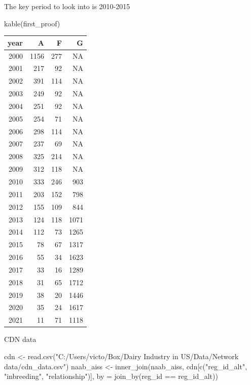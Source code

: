 \documentclass[
]{article}
\newenvironment{Shaded}{\begin{snugshade}}{\end{snugshade}}
\newcommand{\AttributeTok}[1]{\textcolor[rgb]{0.77,0.63,0.00}{#1}}
\newcommand{\FunctionTok}[1]{\textcolor[rgb]{0.00,0.00,0.00}{#1}}
\newcommand{\NormalTok}[1]{#1}
\newcommand{\OtherTok}[1]{\textcolor[rgb]{0.56,0.35,0.01}{#1}}
\newcommand{\SpecialCharTok}[1]{\textcolor[rgb]{0.00,0.00,0.00}{#1}}
\newcommand{\StringTok}[1]{\textcolor[rgb]{0.31,0.60,0.02}{#1}}
\begin{document}
The key period to look into is 2010-2015

\begin{Shaded}
\begin{Highlighting}[]
\FunctionTok{kable}\NormalTok{(first\_proof)}
\end{Highlighting}
\end{Shaded}

\begin{longtable}[]{@{}rrrr@{}}
\toprule()
year & A & F & G \\
\midrule()
\endhead
2000 & 1156 & 277 & NA \\
2001 & 217 & 92 & NA \\
2002 & 391 & 114 & NA \\
2003 & 249 & 92 & NA \\
2004 & 251 & 92 & NA \\
2005 & 254 & 71 & NA \\
2006 & 298 & 114 & NA \\
2007 & 237 & 69 & NA \\
2008 & 325 & 214 & NA \\
2009 & 312 & 118 & NA \\
2010 & 333 & 246 & 903 \\
2011 & 203 & 152 & 798 \\
2012 & 155 & 109 & 844 \\
2013 & 124 & 118 & 1071 \\
2014 & 112 & 73 & 1265 \\
2015 & 78 & 67 & 1317 \\
2016 & 55 & 34 & 1623 \\
2017 & 33 & 16 & 1289 \\
2018 & 31 & 65 & 1712 \\
2019 & 38 & 20 & 1446 \\
2020 & 35 & 24 & 1617 \\
2021 & 11 & 71 & 1118 \\
\bottomrule()
\end{longtable}

CDN data

\begin{Shaded}
\begin{Highlighting}[]
\NormalTok{cdn }\OtherTok{\textless{}{-}} \FunctionTok{read.csv}\NormalTok{(}\StringTok{"C:/Users/victo/Box/Dairy Industry in US/Data/Network data/cdn\_data.csv"}\NormalTok{)}
\NormalTok{naab\_aiss }\OtherTok{\textless{}{-}} \FunctionTok{inner\_join}\NormalTok{(naab\_aiss, cdn[}\FunctionTok{c}\NormalTok{(}\StringTok{"reg\_id\_alt"}\NormalTok{, }\StringTok{"inbreeding"}\NormalTok{, }\StringTok{"relationship"}\NormalTok{)], }\AttributeTok{by =} \FunctionTok{join\_by}\NormalTok{(reg\_id }\SpecialCharTok{==}\NormalTok{ reg\_id\_alt))}
\end{Highlighting}
\end{Shaded}
\end{document}
